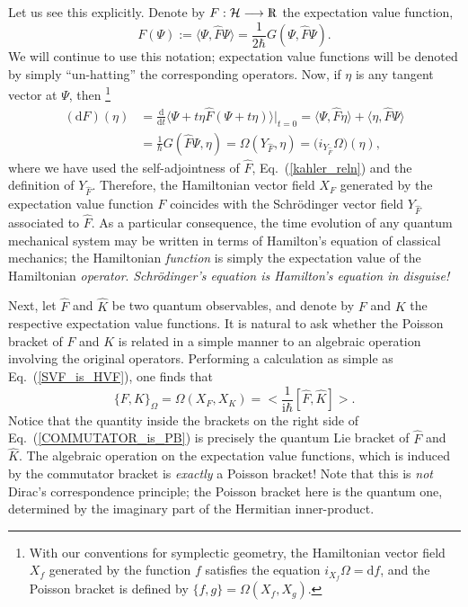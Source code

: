 \documentclass[12pt,aps,eqsecnum,tighten]{revtex4-2}
\def\be{\begin{equation}}
\def\ee{\end{equation}}
\def\ba{\begin{eqnarray}}
\def\ea{\end{eqnarray}}
\def\<{\langle}
\def\>{\rangle}
\def\d{{\mathrm d}}
\def\i{\mathrm{i}}
\def\H{{\cal H}}
\def\W{\Omega}
\newcommand{\eqn}[1]{Eq.~(\ref{#1})}
\newcommand{\hvf}[1]{{X_{#1}}}
\def\Rl{{\mathchoice 
{\setbox0=\hbox{$\displaystyle\rm R$}\hbox{\hbox to0pt
{\kern0.4\wd0\vrule height0.9\ht0\hss}\box0}}
{\setbox0=\hbox{$\textstyle\rm R$}\hbox{\hbox to0pt
{\kern0.4\wd0\vrule height0.9\ht0\hss}\box0}}
{\setbox0=\hbox{$\scriptstyle\rm R$}\hbox{\hbox to0pt
{\kern0.4\wd0\vrule height0.9\ht0\hss}\box0}}
{\setbox0=\hbox{$\scriptscriptstyle\rm R$}\hbox{\hbox to0pt
{\kern0.4\wd0\vrule height0.9\ht0\hss}\box0}}}}
\def\Rl{{\mathchoice
{\setbox0=\hbox{$\displaystyle\rm R$}\hbox{\hbox to0pt
{\kern0.4\wd0\vrule height0.9\ht0\hss}\box0}}
{\setbox0=\hbox{$\textstyle\rm R$}\hbox{\hbox to0pt
{\kern0.4\wd0\vrule height0.9\ht0\hss}\box0}}
{\setbox0=\hbox{$\scriptstyle\rm R$}\hbox{\hbox to0pt
{\kern0.4\wd0\vrule height0.9\ht0\hss}\box0}}
{\setbox0=\hbox{$\scriptscriptstyle\rm R$}\hbox{\hbox to0pt
{\kern0.4\wd0\vrule height0.9\ht0\hss}\box0}}}}
\def\R{\Rl}
\begin{document}
Let us see this explicitly.  Denote by $F : \H \longrightarrow \R$ the
expectation value function,
%
\be
	F(\Psi) := \< \Psi, \hat{F}\Psi \> 
		 = \frac{1}{2\hbar}G(\Psi, \hat{F}\Psi).
\ee
%
We will continue to use this notation; expectation value functions
will be denoted by simply ``un-hatting'' the corresponding operators.
Now, if $\eta$ is any tangent vector at $\Psi$, then%
%
\footnote{With our conventions for symplectic geometry, the
Hamiltonian vector field $\hvf{f}$ generated by the function $f$
satisfies the equation $i_\hvf{f}\W = \d f$, and the Poisson bracket
is defined by $\{f, g \} = \W(\hvf{f}, \hvf{g})$.}
%
\ba
\label{SVF_is_HVF}
(\d F)(\eta) &= \frac{\d}{\d t} \< \Psi + t\eta \hat{F}
(\Psi + t \eta) \> \big|_{t=0}
= \< \Psi, \hat{F}\eta \> + \< \eta, \hat{F}\Psi \>\nonumber \\
&= \frac{1}{\hbar} G(\hat{F}\Psi, \eta)
= \W(Y_{\hat{F}}, \eta) = \big(i_{Y_{\hat{F}}} \W\big)(\eta),
\ea
%
where we have used the self-adjointness of $\hat{F}$,
\eqn{kahler_reln} and the definition of $Y_{\hat{F}}$.  Therefore, the
Hamiltonian vector field $\hvf{F}$ generated by the expectation value
function $F$ coincides with the Schr\"odinger vector field
$Y_{\hat{F}}$ associated to $\hat{F}$.  As a particular consequence,
the time evolution of any quantum mechanical system may be written in
terms of Hamilton's equation of classical mechanics; the Hamiltonian
{\em function} is simply the expectation value of the Hamiltonian {\em
operator}.  {\em Schr\"odinger's equation is Hamilton's equation in
disguise!}

Next, let $\hat{F}$ and $\hat{K}$ be two quantum observables, and
denote by $F$ and $K$ the respective expectation value functions.  It
is natural to ask whether the Poisson bracket of $F$ and $K$ is
related in a simple manner to an algebraic operation involving the
original operators. Performing a calculation as simple as
\eqn{SVF_is_HVF}, one finds that
%
\be \label{COMMUTATOR_is_PB}
\{ F, K \}_\W = \W(\hvf{F}, \hvf{K})
= \bigg< \frac{1}{\i\hbar} [\hat{F}, \hat{K}] \bigg>.
\ee
%
Notice that the quantity inside the brackets on the right side of
\eqn{COMMUTATOR_is_PB} is precisely the quantum Lie bracket of
$\hat{F}$ and $\hat{K}$.  The algebraic operation on the expectation
value functions, which is induced by the commutator bracket is {\em
exactly} a Poisson bracket!  Note that this is {\em not} Dirac's
correspondence principle; the Poisson bracket here is the quantum one,
determined by the imaginary part of the Hermitian inner-product.
\end{document}
